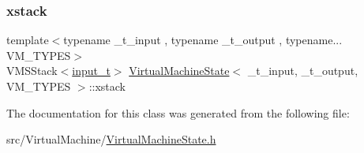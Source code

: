 \mbox{\label{class_virtual_machine_state_aded245a367f3caca62faf7264feaff41}} 
\subsubsection{\texorpdfstring{xstack}{xstack}}
{\footnotesize\ttfamily template$<$typename \+\_\+t\+\_\+input , typename \+\_\+t\+\_\+output , typename... V\+M\+\_\+\+T\+Y\+P\+ES$>$ \\
V\+M\+S\+Stack$<$\hyperlink{class_virtual_machine_state_a04c5592dddd5b9ffdae5a509d73127dd}{input\+\_\+t}$>$ \hyperlink{class_virtual_machine_state}{Virtual\+Machine\+State}$<$ \+\_\+t\+\_\+input, \+\_\+t\+\_\+output, V\+M\+\_\+\+T\+Y\+P\+ES $>$\+::xstack}



The documentation for this class was generated from the following file\+:\begin{DoxyCompactItemize}
\item 
src/\+Virtual\+Machine/\hyperlink{_virtual_machine_state_8h}{Virtual\+Machine\+State.\+h}\end{DoxyCompactItemize}
